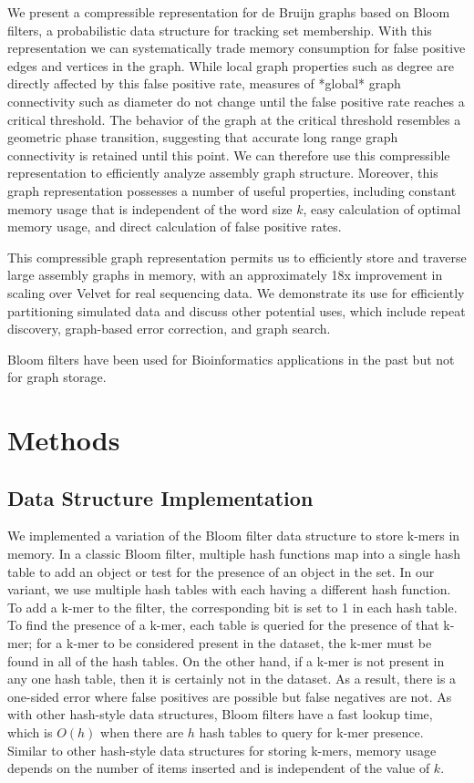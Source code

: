 \documentclass[12pt]{article} \usepackage{simplemargins}
\begin{document}
We present a compressible representation for de Bruijn graphs based on
Bloom filters\cite{bloom}, a probabilistic data structure for tracking set
membership.  With this representation we can systematically trade
memory consumption for false positive edges and vertices in the graph.
While local graph properties such as degree are directly affected by
this false positive rate, measures of *global* graph connectivity such
as diameter do not change until the false positive rate reaches a
critical threshold.  The behavior of the graph at the critical
threshold resembles a geometric phase transition, suggesting that
accurate long range graph connectivity is retained until this point.
We can therefore use this compressible representation to efficiently
analyze assembly graph structure.  Moreover, this graph representation
possesses a number of useful properties, including constant memory
usage that is independent of the word size $k$, easy calculation of
optimal memory usage, and direct calculation of false positive rates.

This compressible graph representation permits us to efficiently store
and traverse large assembly graphs in memory, with an approximately
18x improvement in scaling over Velvet for real sequencing data.  We
demonstrate its use for efficiently partitioning simulated data and
discuss other potential uses, which include repeat discovery,
graph-based error correction, and graph search.

Bloom filters have been used for 
Bioinformatics applications 
in the past\cite{pmid20472541, haskell, pmid20426693} but not for graph 
storage.

\section{Methods}

\subsection{Data Structure Implementation}
We implemented a variation of the Bloom filter data structure to store k-mers
in memory. In a classic Bloom filter, multiple hash functions map into 
a single hash table to add an object or test for the presence of an object 
in the set. In 
our variant, we use multiple hash tables with each having a different hash function. 
To add a k-mer to the filter, the corresponding bit is set to 1 
in each hash table.  
To find the presence of a k-mer, each table is queried for the
presence of that k-mer; for a k-mer to be considered 
present in the dataset, 
the k-mer must be found in all of the hash tables. On the other hand, 
if a k-mer is not present in any one hash table, then it is certainly 
not in the dataset. As a result, there is a one-sided error where 
false positives are possible but false negatives are not. As with other 
hash-style data structures, Bloom filters have a
fast lookup time, which is $O(h)$ when there are $h$ hash tables to query
for k-mer presence. Similar to other hash-style data structures for 
storing k-mers, memory usage depends on the number of items inserted 
and is independent of the value of $k$. 
\end{document}
